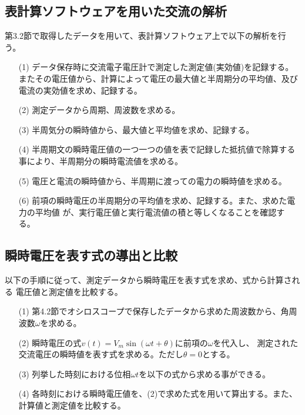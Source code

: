 \documentclass[dvipdfmx]{jsarticle}
\begin{document}
\subsection{表計算ソフトウェアを用いた交流の解析}
第3.2節で取得したデータを用いて、表計算ソフトウェア上で以下の解析を行う。
\begin{itemize}
  \item [(1)]データ保存時に交流電子電圧計で測定した測定値(実効値)を記録する。
        またその電圧値から、計算によって電圧の最大値と半周期分の平均値、及び
        電流の実効値を求め、記録する。
  \item [(2)]測定データから周期、周波数を求める。
  \item [(3)]半周気分の瞬時値から、最大値と平均値を求め、記録する。
  \item [(4)]半周期文の瞬時電圧値の一つ一つの値を表で記録した抵抗値で除算する事により、半周期分の瞬時電流値を求める。
  \item [(5)]電圧と電流の瞬時値から、半周期に渡っての電力の瞬時値を求める。
  \item [(6)]前項の瞬時電圧の半周期分の平均値を求め、記録する。また、求めた電力の平均値
            が、実行電圧値と実行電流値の積と等しくなることを確認する。
\end{itemize}

\subsection{瞬時電圧を表す式の導出と比較}
以下の手順に従って、測定データから瞬時電圧を表す式を求め、式から計算される
電圧値と測定値を比較する。
\begin{itemize}
  \item [(1)]第4.2節でオシロスコープで保存したデータから求めた周波数から、角周波数$\omega$を求める。
  \item [(2)]瞬時電圧の式$v(t) = V_m \sin(\omega t + \theta)$に前項の$\omega$を代入し、
              測定された交流電圧の瞬時値を表す式を求める。ただし$\theta = 0$とする。
  \item[(3)]列挙した時刻における位相$\omega t$を以下の式から求める事ができる。
  \item[(4)]各時刻における瞬時電圧値を、(2)で求めた式を用いて算出する。また、計算値と測定値を比較する。
\end{itemize}
\end{document}
